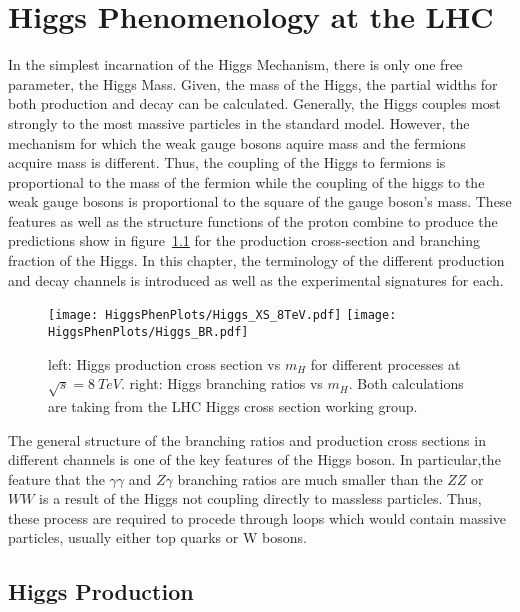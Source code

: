 \chapter{Higgs Phenomenology at the LHC}
\label{sec:HiggsPhen}

In the simplest incarnation of the Higgs Mechanism, there is only one free
parameter, the Higgs Mass.  Given, the mass of the Higgs, the partial widths
for both production and decay can be calculated.  Generally, the Higgs 
couples most strongly to the most massive particles in the standard model.  
However, the mechanism for which the weak gauge bosons aquire mass and the 
fermions acquire mass is different.  Thus, the coupling of the Higgs to 
fermions is proportional to the mass of the fermion while the coupling of the 
higgs to the weak gauge bosons is proportional to the square of the gauge 
boson's mass. These features as well as the structure functions of the proton 
combine to produce the predictions show in figure~\ref{fig:HiggsProdXS} 
for the production 
cross-section and branching fraction of the Higgs.  In this chapter, the 
terminology of the different production and decay channels is introduced as 
well as the experimental signatures for each.  

\begin{figure}
\begin{center}
\texttt{[image: HiggsPhenPlots/Higgs\_XS\_8TeV.pdf]}
\texttt{[image: HiggsPhenPlots/Higgs\_BR.pdf]}
\label{fig:HiggsProdXS}
\caption{left: Higgs production cross section vs $m_H$ for 
different processes at $\sqrt{s}=8~TeV$. right: Higgs branching
ratios vs $m_H$.  Both calculations are taking from the LHC Higgs
cross section working group. }
\end{center}
\end{figure}

The general structure of the branching ratios and production cross 
sections in different channels is one of the key features of the Higgs 
boson.  In particular,the feature that the $\gamma\gamma$ and $Z\gamma$
branching ratios are much smaller than the $ZZ$ or $WW$ is a result 
of the Higgs not coupling directly to massless particles.  Thus, these
process are required to procede through loops which would contain massive
particles, usually either top quarks or W bosons.

\section{Higgs Production}

